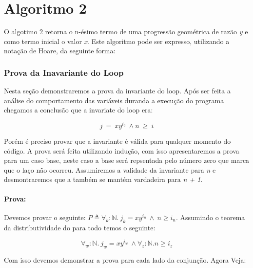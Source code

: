 \newpage

\section{Algoritmo 2}
\label{sec:algo2}

O algotimo 2 retorna o n-ésimo termo de uma progressão geométrica de razão
\emph{y} e como termo inicial o valor \emph{x}. Este algoritmo pode ser
expresso, utilizando a notação de Hoare, da seguinte forma:

\subsubsection{Prova da Inavariante do Loop}
\label{ssub:Prova da Inavariante do Loop}

Nesta seção demonstraremos a prova da invariante do loop. Após ser feita a
análise do comportamento das variáveis duranda a execução do programa chegamos a
conclusão que a invariate do loop era:

$$ j\  =\ xy^{i_0}\ \land n\ \geq\ i $$

Porém é preciso provar que a invariante é válida para qualquer momento do
código. A prova será feita utilizando indução, com isso apresentaremos a prova
para um caso base, neste caso a base será repsentada pelo número zero que marca
que o laço não ocorreu. Assumiremos a validade da invariante para \emph{n} e
desmontraremos que a também se mantém vardadeira para \emph{n + 1}.

\paragraph{Prova:} 
Devemos provar o seguinte: $P \triangleq \forall_k :\mathbb{N} .\ j_k=xy^{i_n}\ \land\
n \geq i_n$. Assumindo o teorema da distributividade do para todo temos o
seguinte:

$$\forall_w :\mathbb{N}.\ j_w=xy^{i_w}\ \land  \forall_z:\mathbb{N}. n \geq i_z$$

Com isso devemos demonstrar a prova para cada lado da conjunção. Agora Veja:


